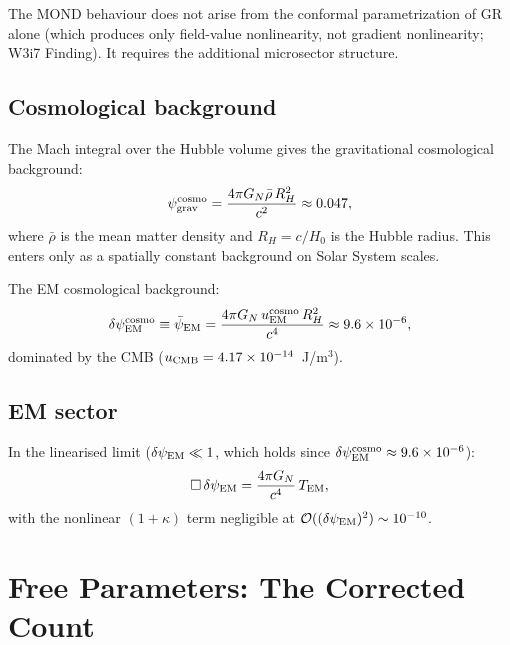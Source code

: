 \documentclass[11pt]{article}
\newcommand{\ee}[1]{\times 10^{#1}}
\newcommand{\psigrav}{\psi_{\rm grav}}
\newcommand{\dpsiEM}{\delta\psi_{\rm EM}}
\newcommand{\psiEM}{\bar{\psi}_{\rm EM}}
\newcommand{\GN}{G_N}
\newcommand{\Hzero}{H_0}
\newcommand{\RH}{R_H}
\newcommand{\order}[1]{\mathcal{O}(#1)}
\begin{document}
The MOND behaviour does not arise from the conformal parametrization
of GR alone (which produces only field-value nonlinearity, not gradient
nonlinearity; W3i7 Finding). It requires the additional microsector
structure.

\subsection{Cosmological background}

The Mach integral over the Hubble volume gives the gravitational
cosmological background:
\begin{equation}
\psigrav^{\rm cosmo} = \frac{4\pi\GN\bar{\rho}\,\RH^2}{c^2}
\approx 0.047,
\label{eq:psigrav-cosmo}
\end{equation}
where $\bar{\rho}$ is the mean matter density and $\RH = c/\Hzero$
is the Hubble radius. This enters only as a spatially constant background
on Solar System scales.

The EM cosmological background:
\begin{equation}
\dpsiEM^{\rm cosmo} \equiv \psiEM
= \frac{4\pi\GN\,u_{\rm EM}^{\rm cosmo}\,\RH^2}{c^4}
\approx 9.6\ee{-6},
\label{eq:dpsiEM-cosmo}
\end{equation}
dominated by the CMB ($u_{\rm CMB} = 4.17\ee{-14}$~J/m$^3$).

\subsection{EM sector}

In the linearised limit ($\dpsiEM \ll 1$, which holds since
$\dpsiEM^{\rm cosmo} \approx 9.6\ee{-6}$):
\begin{equation}
\Box\,\dpsiEM = \frac{4\pi\GN}{c^4}\,T_{\rm EM},
\label{eq:EM-linear}
\end{equation}
with the nonlinear $(1+\kappa)$ term negligible at
$\order{(\dpsiEM)^2} \sim 10^{-10}$.


\section{Free Parameters: The Corrected Count}
\label{sec:parameters}
\end{document}
